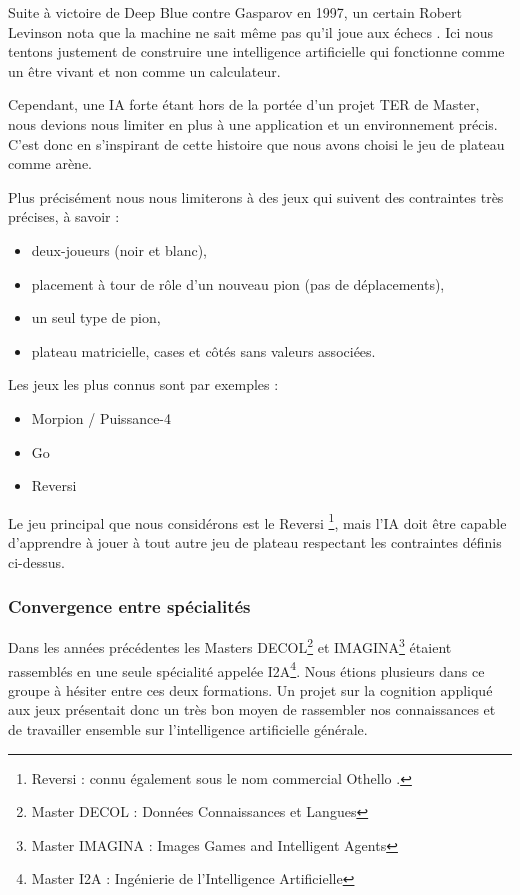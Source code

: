 Suite à victoire de Deep Blue contre Gasparov en 1997, un certain Robert Levinson nota que la machine \og ne sait même pas qu'il joue aux échecs \fg{}. Ici nous tentons justement de construire une intelligence artificielle qui fonctionne comme un être vivant et non comme un calculateur.

Cependant, une IA \og forte \fg{} étant hors de la portée d'un projet TER de Master, nous devions nous limiter en plus à une application et un environnement précis. C'est donc en s'inspirant de cette histoire que nous avons choisi le jeu de plateau comme arène.

Plus précisément nous nous limiterons à des jeux qui suivent des contraintes très précises, à savoir :

\begin{itemize}
\item deux-joueurs (noir et blanc),
\item placement à tour de rôle d'un nouveau pion (pas de déplacements),
\item un seul type de pion,
\item plateau matricielle, cases et côtés sans valeurs associées.
\end{itemize}

Les jeux les plus connus sont par exemples :

\begin{itemize}
\item Morpion / Puissance-4
\item Go
\item Reversi
\end{itemize}

Le jeu principal que nous considérons est le \og Reversi \fg{}\footnote{ \og Reversi \fg{} : connu également sous le nom commercial \og Othello \fg{}. }, mais l'IA doit être capable d'apprendre à jouer à tout autre jeu de plateau respectant les contraintes définis ci-dessus.

\subsubsection{Convergence entre spécialités }
Dans les années précédentes les Masters DECOL\footnote{ Master DECOL : \og Données Connaissances et Langues \fg{} } et IMAGINA\footnote{ Master IMAGINA : \og Images Games and Intelligent Agents \fg{} } étaient rassemblés en une seule spécialité appelée I2A\footnote { Master I2A : \og Ingénierie de l'Intelligence Artificielle \fg{} }.
Nous étions plusieurs dans ce groupe à hésiter entre ces deux formations. Un projet sur la cognition appliqué aux jeux présentait donc un très bon moyen de rassembler nos connaissances et de travailler ensemble sur l'intelligence artificielle générale.

